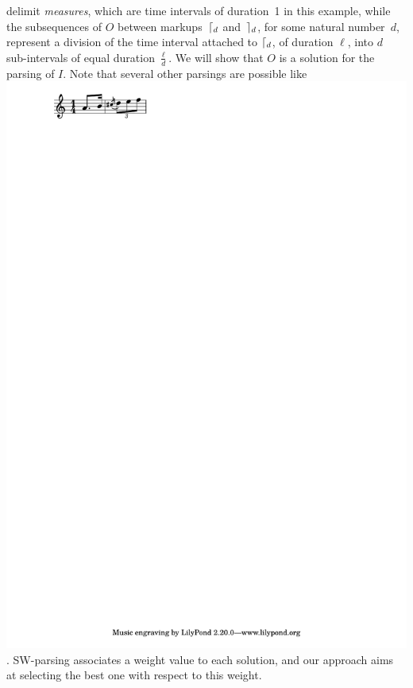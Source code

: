\begin{example}
delimit \emph{measures},
which are time intervals of duration~1 in this example,
while the subsequences of $O$ between markups~$\lceil_{d}$ and~$\rceil_{d}$,
for some natural number~$d$,
represent a division of the time interval attached to $\lceil_{d}$,
of duration $\ell$,
into $d$ sub-intervals of equal duration $\frac{\ell}{d}$.
%
We will show that $O$ is a solution for the
parsing of $I$. Note that several other parsings are possible
like \eg \includegraphics[scale=0.35,trim=0 5mm 0 0]{pictures/ex2.pdf}.
SW-parsing associates a weight value
to each solution, and our approach
aims at selecting the best one with respect to this weight.
\endex
\end{example}
